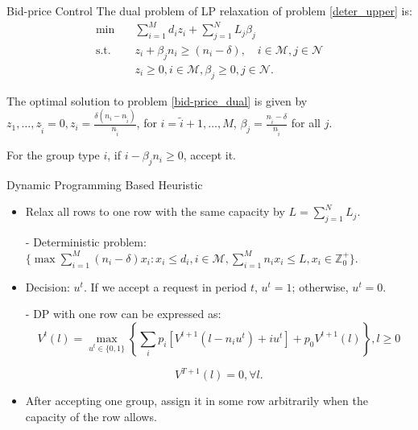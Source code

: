       \begin{frame}{Bid-price Control}
        The dual problem of LP relaxation of problem \eqref{deter_upper} is:
        \begin{equation}\label{bid-price_dual}
          \begin{aligned}
          \min \quad & \sum_{i=1}^{M} d_i z_i + \sum_{j= 1}^{N} L_j \beta_{j} \\
          \text {s.t.} \quad & z_{i} + \beta_j n_i \geq (n_i-\delta), \quad i \in \mathcal{M}, j \in \mathcal{N} \\
          & z_{i} \geq 0, i \in \mathcal{M}, \beta_{j} \geq 0, j \in \mathcal{N}.
          \end{aligned}
        \end{equation}
        
        \small
        
        The optimal solution to problem \eqref{bid-price_dual} is given by $z_1, \ldots, z_{\tilde{i}} =0, z_i = \frac{\delta (n_i - n_{\tilde{i}})}{n_{\tilde{i}}}$, for $i = \tilde{i} + 1, \ldots, M$, $\beta_j = \frac{n_{\tilde{i}} - \delta}{n_{\tilde{i}}}$ for all $j$.
        \vspace{0.5cm}

        For the group type $i$, if $i - \beta_j n_i \geq 0$, accept it. 
      \end{frame}

      \begin{frame}{Dynamic Programming Based Heuristic}
        \begin{itemize}
        \item Relax all rows to one row with the same capacity by $L = \sum_{j=1}^{N} L_j$.
        \item[-] Deterministic problem: $\{\max \sum_{i=1}^{M} (n_i- \delta) x_{i}: x_{i} \leq d_{i}, i \in \mathcal{M}, \sum_{i=1}^{M} n_{i} x_{i} \leq L, x_{i} \in \mathbb{Z}^{+}_{0}\}$.
        \item Decision: $u^{t}$. If we accept a request in period $t$, $u^t = 1$; otherwise, $u^t =0$.  
        \item[-] DP with one row can be expressed as:
        $$V^{t}(l) =  \max_{u^{t} \in \{0,1\}} \left\{ \sum_{i} p_i [V^{t+1}(l-n_i u^{t})+ i u^{t}] + p_0 V^{t+1}(l)\right\}, l \geq 0 $$

        $$V^{T+1}(l) =0, \forall l.$$
        \item After accepting one group, assign it in some row arbitrarily when the capacity of the row allows.
        \end{itemize}
      \end{frame}
      
